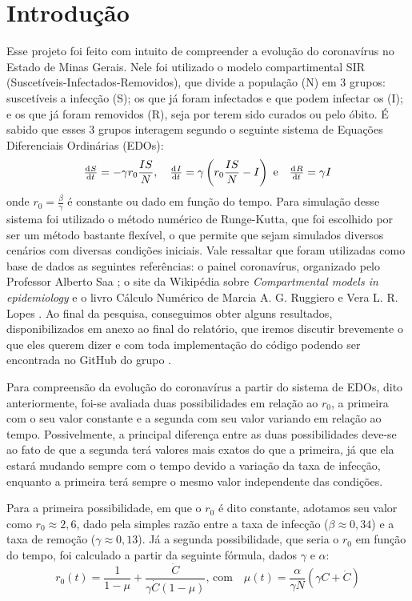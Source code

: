 \documentclass[11pt, a4paper]{article}
\begin{document}


\section{Introdução}
Esse projeto foi feito com intuito de compreender a evolução do coronavírus no Estado de Minas Gerais.
Nele foi utilizado o modelo compartimental SIR (Suscetíveis-Infectados-Removidos), que divide a população (N) em 3 grupos: suscetíveis a infecção (S); os que já foram infectados e que podem infectar os  (I); e os que já foram removidos (R), seja por terem sido curados ou pelo óbito. 
É sabido que esses 3 grupos interagem segundo o seguinte sistema de Equações Diferenciais Ordinárias (EDOs):
\[
	\od{S}{t} = - \gamma r_0 \frac{IS}{N} , \quad
	\od{I}{t} = \gamma \left( r_0 \frac{IS}{N} - I \right) \text{ e} \quad
	\od{R}{t} = \gamma I
\]
onde $r_0 = \frac{\beta}{\gamma}$ é constante ou dado em função do tempo. 
Para simulação desse sistema foi utilizado o método numérico de Runge-Kutta, que foi escolhido por ser um método bastante flexível, o que permite que sejam simulados  diversos cenários com diversas condições iniciais.
Vale ressaltar que foram utilizadas como base de dados as seguintes referências:
o painel coronavírus, organizado pelo Professor Alberto Saa \cite{git_saa};
o site da Wikipédia sobre \emph{Compartmental models in epidemiology} \cite{model}
e o livro Cálculo Numérico de Marcia A. G. Ruggiero e Vera L. R. Lopes \cite{calc_num}.
Ao final da pesquisa, conseguimos obter alguns resultados, disponibilizados em anexo ao final do relatório, que iremos discutir brevemente o que eles querem dizer e com toda implementação do código podendo ser encontrada no GitHub do grupo \cite{git_grupo}.

Para compreensão da evolução do coronavírus a partir do sistema de EDOs, dito anteriormente, foi-se avaliada duas possibilidades em relação ao $r_0$, a primeira com o seu valor constante e a segunda com seu valor variando em relação ao tempo.
Possivelmente, a principal diferença entre as duas possibilidades deve-se ao fato de que a segunda terá valores mais exatos do que a primeira, já que ela estará mudando sempre com o tempo devido a variação da taxa de infecção, enquanto a primeira terá sempre o mesmo valor independente das condições.

Para a primeira possibilidade, em que o $r_0$ é dito constante, adotamos seu valor como $r_0 \approx 2,6$, dado pela simples razão entre a taxa de infecção ($\beta \approx 0,34$) e a taxa de remoção ($\gamma \approx 0,13$).
Já a segunda possibilidade, que seria o $r_0$ em função do tempo, foi calculado a partir da seguinte fórmula, dados $\gamma$ e $\alpha$:
\[
	r_0(t) = \frac{1}{1 - \mu} + \frac{\ddot{C}}{\gamma \dot{C} (1 - \mu)}
	\text{, com} \quad
	\mu(t) = \frac{\alpha}{\gamma N} (\gamma C + \dot{C})
\]

\printbibliography
\end{document}
